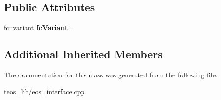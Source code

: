 \subsection*{Public Attributes}
\begin{DoxyCompactItemize}
\item 
\mbox{\label{classteos_1_1command_1_1_call_chain_a0afbe899ce8a5039702701e82f7ec9f2}} 
fc\+::variant {\bfseries fc\+Variant\+\_\+}
\end{DoxyCompactItemize}
\subsection*{Additional Inherited Members}


The documentation for this class was generated from the following file\+:\begin{DoxyCompactItemize}
\item 
teos\+\_\+lib/eos\+\_\+interface.\+cpp\end{DoxyCompactItemize}
